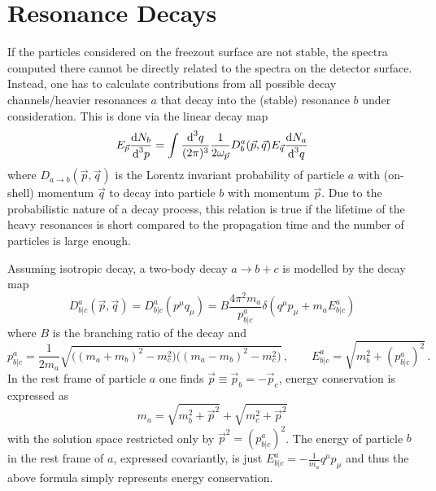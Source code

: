 \chapter{Resonance Decays}

If the particles considered on the freezout surface are not stable, the spectra computed there cannot be directly related to the spectra on the detector surface. Instead, one has to calculate contributions from all possible decay channels/heavier resonances $a$ that decay into the (stable) resonance $b$ under consideration. This is done via the linear decay map
\begin{equation}
    E_{\vec{p}}\frac{\text{d} N_b}{\text{d}^3p}=\int\frac{\text{d}^3q}{(2\pi)^3}\frac{1}{2\omega_{\vec{p}}}D^a_b(\vec{p},\vec{q})E_{\vec{q}}\frac{\text{d} N_a}{\text{d}^3 q}
\end{equation} 
where $D_{a\rightarrow b}(\vec{p},\vec{q})$ is the Lorentz invariant probability of particle $a$ with (on-shell) momentum $\vec{q}$ to decay into particle $b$ with momentum $\vec{p}$. Due to the probabilistic nature of a decay process, this relation is true if the lifetime of the heavy resonances is short compared to the propagation time and the number of particles is large enough.

Assuming isotropic decay, a two-body decay $a\rightarrow b+c$ is modelled by the decay map 
\begin{equation}
    D^a_{b\vert c}(\vec{p},\vec{q})=D^a_{b\vert c}(p^\mu q_\mu)=B\frac{4\pi^2 m_a}{p^a_{b\vert c}}\delta(q^\mu p_\mu+m_a E^a_{b\vert c})
\end{equation}
where $B$ is the branching ratio of the decay and
\begin{equation}
    p^a_{b\vert c}=\frac{1}{2m_a}\sqrt{\big((m_a+m_b)^2-m_c^2\big)\big((m_a-m_b)^2-m_c^2\big)}\,,\qquad E^a_{b\vert c}=\sqrt{m_b^2+(p^a_{b\vert c})^2}\,.
\end{equation}
In the rest frame of particle $a$ one finds $\vec{p}\equiv \vec{p}_b=-\vec{p}_c$, energy conservation is expressed as
\begin{equation}
    m_a=\sqrt{m_b^2+\vec{p}^2}+\sqrt{m_c^2+\vec{p}^2}
\end{equation}
with the solution space restricted only by $\vec{p}^2=(p^a_{b\vert c})^2$. The energy of particle $b$ in the rest frame of $a$, expressed covariantly, is just $E^a_{b\vert c}=-\frac{1}{m_a}q^\mu p_\mu$ and thus the above formula simply represents energy conservation.

